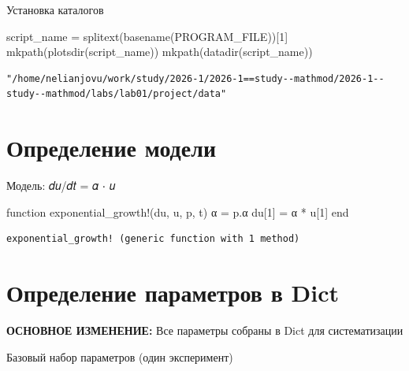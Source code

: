 \documentclass[
  12pt,
  a4paper,
  DIV=11,
  numbers=noendperiod]{scrreprt}
\newenvironment{Shaded}{\begin{snugshade}}{\end{snugshade}}
\newcommand{\ConstantTok}[1]{\textcolor[rgb]{0.56,0.35,0.01}{#1}}
\newcommand{\FloatTok}[1]{\textcolor[rgb]{0.68,0.00,0.00}{#1}}
\newcommand{\FunctionTok}[1]{\textcolor[rgb]{0.28,0.35,0.67}{#1}}
\newcommand{\KeywordTok}[1]{\textcolor[rgb]{0.00,0.23,0.31}{#1}}
\newcommand{\NormalTok}[1]{\textcolor[rgb]{0.00,0.23,0.31}{#1}}
\newcommand{\OperatorTok}[1]{\textcolor[rgb]{0.37,0.37,0.37}{#1}}
\begin{document}
Установка каталогов

\begin{Shaded}
\begin{Highlighting}[]
\NormalTok{script\_name }\OperatorTok{=} \FunctionTok{splitext}\NormalTok{(}\FunctionTok{basename}\NormalTok{(}\ConstantTok{PROGRAM\_FILE}\NormalTok{))[}\FloatTok{1}\NormalTok{]}
\FunctionTok{mkpath}\NormalTok{(}\FunctionTok{plotsdir}\NormalTok{(script\_name))}
\FunctionTok{mkpath}\NormalTok{(}\FunctionTok{datadir}\NormalTok{(script\_name))}
\end{Highlighting}
\end{Shaded}

\begin{verbatim}
"/home/nelianjovu/work/study/2026-1/2026-1==study--mathmod/2026-1--study--mathmod/labs/lab01/project/data"
\end{verbatim}

\section{Определение
модели}\label{ux43eux43fux440ux435ux434ux435ux43bux435ux43dux438ux435-ux43cux43eux434ux435ux43bux438-1}

Модель: 𝑑𝑢/𝑑𝑡 = 𝛼 ⋅ 𝑢

\begin{Shaded}
\begin{Highlighting}[]
\KeywordTok{function} \FunctionTok{exponential\_growth!}\NormalTok{(du, u, p, t)}
\NormalTok{    α }\OperatorTok{=}\NormalTok{ p.α}
\NormalTok{    du[}\FloatTok{1}\NormalTok{] }\OperatorTok{=}\NormalTok{ α }\OperatorTok{*}\NormalTok{ u[}\FloatTok{1}\NormalTok{]}
\KeywordTok{end}
\end{Highlighting}
\end{Shaded}

\begin{verbatim}
exponential_growth! (generic function with 1 method)
\end{verbatim}

\section{Определение параметров в
Dict}\label{ux43eux43fux440ux435ux434ux435ux43bux435ux43dux438ux435-ux43fux430ux440ux430ux43cux435ux442ux440ux43eux432-ux432-dict}

\textbf{ОСНОВНОЕ ИЗМЕНЕНИЕ:} Все параметры собраны в Dict для
систематизации

Базовый набор параметров (один эксперимент)
\end{document}
